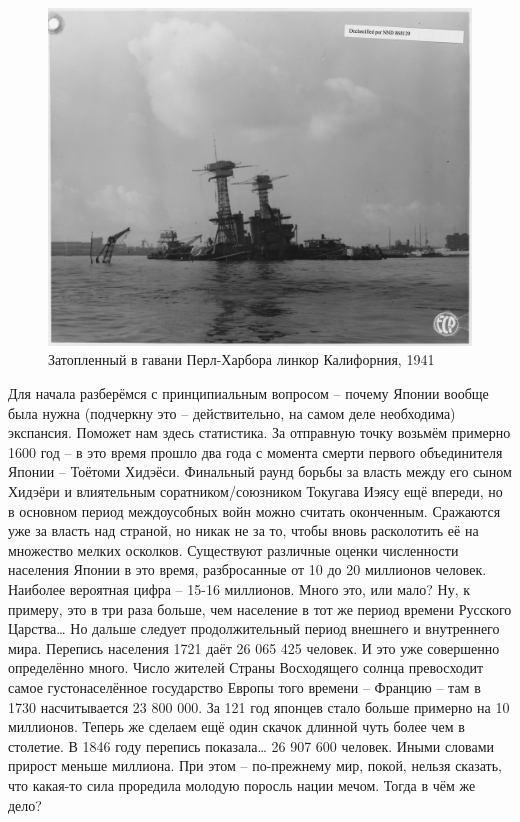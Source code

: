\begin{figure}[h!tb] 
	\centering\includegraphics[scale=0.5]{Glava1/UWUiFP19AEM.jpg}
	\caption{Затопленный в гавани Перл-Харбора линкор Калифорния, 1941}%
\end{figure}


Для начала разберёмся с принципиальным вопросом – почему Японии вообще была нужна (подчеркну это – действительно, на самом деле необходима) экспансия. Поможет нам здесь статистика. За отправную точку возьмём примерно 1600 год – в это время прошло два года с момента смерти первого объединителя Японии – Тоётоми Хидэёси. Финальный раунд борьбы за власть между его сыном Хидэёри и влиятельным соратником/союзником Токугава Иэясу ещё впереди, но в основном период междоусобных войн можно считать оконченным. Сражаются уже за власть над страной, но никак не за то, чтобы вновь расколотить её на множество мелких осколков. Существуют различные оценки численности населения Японии в это время, разбросанные от 10 до 20 миллионов человек. Наиболее вероятная цифра – 15-16 миллионов. Много это, или мало? Ну, к примеру, это в три раза больше, чем население в тот же период времени Русского Царства… Но дальше следует продолжительный период внешнего и внутреннего мира. Перепись населения 1721 даёт 26 065 425 человек. И это уже совершенно определённо много. Число жителей Страны Восходящего солнца превосходит самое густонаселённое государство Европы того времени – Францию – там в 1730 насчитывается 23 800 000. За 121 год японцев стало больше примерно на 10 миллионов. Теперь же сделаем ещё один скачок длинной чуть более чем в столетие. В 1846 году перепись показала… 26 907 600 человек. Иными словами прирост меньше миллиона. При этом – по-прежнему мир, покой, нельзя сказать, что какая-то сила проредила молодую поросль нации мечом. Тогда в чём же дело?

